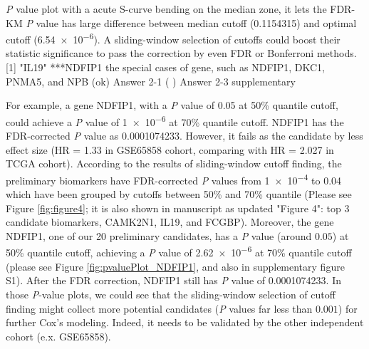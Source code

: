 \documentclass[preprint,12pt]{elsarticle}
\newenvironment{MyColorPar}[1]{%
    \leavevmode\color{#1}\ignorespaces%
}{%
}%
\begin{document}
\begin{MyColorPar}{blue}
\begin{MyColorPar}{red}
\textit{P} value plot with a acute S-curve bending on the median zone, it lets the FDR-KM \textit{P} value has large difference between median cutoff (\num[round-precision=3, round-mode=figures,
scientific-notation=true]{0.1154315}) and optimal cutoff (\num{6.54e-6}).
A sliding-window selection of cutoffs could boost their statistic significance to pass the correction by even FDR or Bonferroni methods.
[1] "IL19"
***NDFIP1
the special cases of gene, such as NDFIP1, DKC1, PNMA5, and NPB %
(ok) Answer 2-1 %
( )  Answer 2-3 supplementary  %

For example, a gene NDFIP1, with a \textit{P} value of 0.05 at 50\% quantile cutoff, could achieve a \textit{P} value of \num{1e-6} at 70\% quantile cutoff.
NDFIP1 has the FDR-corrected \textit{P} value as \num[round-precision=3, round-mode=figures,
scientific-notation=true]{0.0001074233}.
However, it fails as the candidate by less effect size (HR = 1.33 in GSE65858 cohort, comparing with HR = 2.027 in TCGA cohort).
According to the results of sliding-window cutoff finding, the preliminary biomarkers have FDR-corrected \textit{P} values from \num{1e-4} to 0.04 which have been grouped by cutoffs between 50\% and 70\% quantile (Please see Figure \ref{fig:figure4}; it is also shown in manuscript as updated "Figure 4": top 3 candidate biomarkers, CAMK2N1, IL19, and FCGBP).
Moreover, the gene NDFIP1, one of our 20 preliminary candidates, has a \textit{P} value (around $0.05$) at 50\% quantile cutoff, achieving a \textit{P} value of \num{2.62e-6} at 70\% quantile cutoff (please see Figure \ref{fig:pvaluePlot_NDFIP1}, and also in 
supplementary figure S1). After the FDR correction, NDFIP1 still has \textit{P} value of \num[round-precision=3, round-mode=figures,
scientific-notation=true]{0.0001074233}.
In those \textit{P}-value plots, we could see that the sliding-window selection of cutoff finding might collect more potential candidates (\textit{P} values far less than $0.001$) for further Cox's modeling.
Indeed, it needs to be validated by the other independent cohort (e.x. GSE65858).



\end{MyColorPar} %


\end{MyColorPar} %
\end{document}
